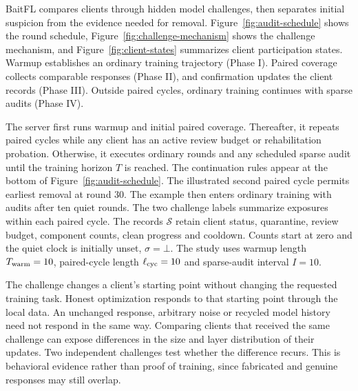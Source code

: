 \documentclass[journal]{IEEEtran}
\makeatletter
\renewcommand{\section}{\@startsection{section}{1}{\z@}{1.5ex}{0.7ex}{\normalfont\normalsize\centering\scshape}}
\makeatother
\begin{document}
\section{Proposed Methodology}\label{sec:method}
BaitFL compares clients through hidden model challenges, then separates
initial suspicion from the evidence needed for removal.
Figure~\ref{fig:audit-schedule} shows the round schedule,
Figure~\ref{fig:challenge-mechanism} shows the challenge mechanism, and
Figure~\ref{fig:client-states} summarizes client participation states.
Warmup establishes an ordinary training trajectory
(Phase I). Paired coverage collects comparable responses
(Phase II), and confirmation updates the client records
(Phase III). Outside paired cycles, ordinary training
continues with sparse audits (Phase IV).

The server first runs warmup and initial paired coverage. Thereafter, it
repeats paired cycles while any client has an active review budget or
rehabilitation probation. Otherwise, it executes ordinary rounds and any
scheduled sparse audit until the training horizon $T$ is reached. The
continuation rules appear at the bottom of Figure~\ref{fig:audit-schedule}.
The illustrated second paired cycle permits earliest removal at round 30.
The example then enters ordinary training with audits after ten quiet rounds.
The two challenge labels summarize exposures within each paired cycle.
The records $\mathcal S$ retain client status, quarantine, review budget,
component counts, clean progress and cooldown. Counts start at zero and
the quiet clock is initially unset, $\sigma=\bot$. The study uses warmup length
$T_{\rm warm}=10$, paired-cycle length $\ell_{\rm cyc}=10$ and sparse-audit interval $I=10$.

The challenge changes a client's starting point without changing the
requested training task. Honest optimization responds to that starting
point through the local data. An unchanged response, arbitrary noise or
recycled model history need not respond in the same way. Comparing
clients that received the same challenge can expose differences in the
size and layer distribution of their updates. Two independent challenges
test whether the difference recurs. This is behavioral evidence rather
than proof of training, since fabricated and genuine responses may still
overlap.
\end{document}
